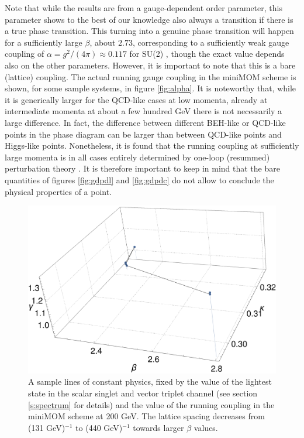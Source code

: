 \documentclass[final,12pt,3p,longtitle]{elsarticle}
\newcommand*{\1}{1\!\!\!\bot}
\begin{document}
Note that while the results are from a gauge-dependent order parameter, this parameter shows to the best of our knowledge also always a transition if there is a true phase transition. This turning into a genuine phase transition will happen for a sufficiently large $\beta$, about $2.73$, corresponding to a sufficiently weak gauge coupling of $\alpha=g^2/(4\pi)\approx0.117$ for SU(2) \cite{Bonati:2009pf,Bonati:2009yi}, though the exact value depends also on the other parameters. However, it is important to note that this is a bare (lattice) coupling. The actual running gauge coupling in the miniMOM scheme \cite{vonSmekal:2009ae} is shown, for some sample systems, in figure \ref{fig:alpha}. It is noteworthy that, while it is generically larger for the QCD-like cases at low momenta, already at intermediate momenta at about a few hundred GeV there is not necessarily a large difference. In fact, the difference between different BEH-like or QCD-like points in the phase diagram can be larger than between QCD-like points and Higgs-like points. Nonetheless, it is found that the running coupling at sufficiently large momenta is in all cases entirely determined by one-loop (resummed) perturbation theory \cite{Maas:2013aia}. It is therefore important to keep in mind that the bare quantities of figures \ref{fig:gdpdl} and \ref{fig:gdpdc} do not allow to conclude the physical properties of a point.

\begin{figure}[!htbp]
\includegraphics[width=\linewidth]{lcp-example}
\caption{\label{fig:lcpex}A sample lines of constant physics, fixed by the value of the lightest state in the scalar singlet and vector triplet channel (see section \ref{s:spectrum} for details) and the value of the running coupling in the miniMOM scheme at 200 GeV. The lattice spacing decreases from (131 GeV)$^{-1}$ to (440 GeV)$^{-1}$ towards larger $\beta$ values.}
\end{figure}
\end{document}
